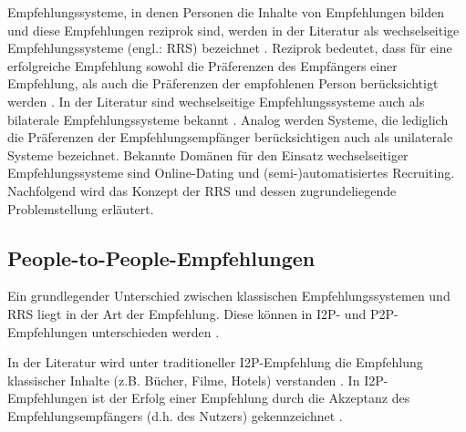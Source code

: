 Empfehlungssysteme, in denen Personen die Inhalte von Empfehlungen bilden und diese Empfehlungen reziprok sind, werden in der Literatur als wechselseitige Empfehlungssysteme (engl.: \ac{RRS}) bezeichnet \cite[S. 35]{li:inproceedings}\cite[S. 2199]{akehurst:inproceedings}\cite[S. 207]{pizzato:2010}.
Reziprok bedeutet, dass für eine erfolgreiche Empfehlung sowohl die Präferenzen des Empfängers einer Empfehlung, als auch die Präferenzen der empfohlenen Person berücksichtigt werden \cite[S. 447]{pizzato:2013}\cite[S. 22]{kleinerman:inproceedings}.
In der Literatur sind wechselseitige Empfehlungssysteme auch als bilaterale Empfehlungssysteme bekannt \cite[S. 32]{link:booklet}.
Analog werden Systeme, die lediglich die Präferenzen der Empfehlungsempfänger berücksichtigen auch als unilaterale Systeme bezeichnet.
Bekannte Domänen für den Einsatz wechselseitiger Empfehlungssysteme sind Online-Dating und (semi-)automatisiertes Recruiting.
Nachfolgend wird das Konzept der \ac{RRS} und dessen zugrundeliegende Problemstellung erläutert.

\subsection{People-to-People-Empfehlungen}%
\label{ch:empfehlungssysteme:rrs:people_to_people}
Ein grundlegender Unterschied zwischen klassischen Empfehlungssystemen und \ac{RRS} liegt in der Art der Empfehlung.
Diese können in \ac{I2P}- und \ac{P2P}-Empfehlungen unterschieden werden \cite[S. 62f.]{kim:inproceedings}.

In der Literatur wird unter traditioneller \ac{I2P}-Empfehlung die Empfehlung klassischer Inhalte (z.B. Bücher, Filme, Hotels) verstanden \cite[S. 2199]{akehurst:inproceedings}\cite[S. 2429]{palomares:inproceedings}.
In \ac{I2P}-Empfehlungen ist der Erfolg einer Empfehlung durch die Akzeptanz des Empfehlungsempfängers (d.h. des Nutzers) gekennzeichnet \cite[S. 131]{kleinerman:2:inproceedings}\cite[S. 546]{koprinska:inbook}.

